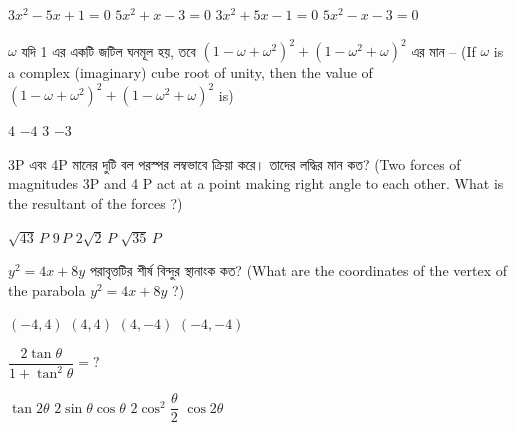 \documentclass[addpoints]{exam}
\begin{document}
\begin{questions}
\begin{oneparchoices}
\choice $ 3x^{2}-5x+1= 0 $
\choice $ 5x^{2}+x-3= 0 $
\choice $ 3x^{2}+5x-1= 0 $
\choice $ 5x^{2}-x-3= 0 $
\end{oneparchoices}

\question $ \omega $ যদি 1 এর একটি জটিল ঘনমূল হয়, তবে $ (1-\omega +\omega^{2})^{2}+(1-\omega^{2}+\omega)^{2} $ এর মান – (If $ \omega $ is a complex (imaginary) cube root of unity, then the value of $ (1-\omega +\omega^{2})^{2}+(1-\omega^{2}+\omega)^{2} $ is)
 
\begin{oneparchoices}
\choice $ 4 $
\choice $ -4 $
\choice $ 3 $
\choice $ -3 $
\end{oneparchoices}

\question 3P এবং 4P মানের দুটি বল পরস্পর লম্বভাবে ক্রিয়া করে। তাদের লদ্ধির মান কত? (Two forces of magnitudes 3P and 4 P act at a point making right angle to each other. What is the resultant of the forces ?)


\begin{oneparchoices}
 \choice $ \sqrt{43}\,P $
 \choice $ 9\,P $
 \choice $ 2\sqrt{2}\,P $
 \choice $ \sqrt{35}\,P $
\end{oneparchoices}

\question  $ y^{2} = 4x+8y $ পরাবৃত্তটির শীর্ষ বিন্দুর স্থানাংক কত? (What are the coordinates of the vertex of the parabola $ y^{2} = 4x+8y $ ?)

\begin{oneparchoices}
\choice $ (-4,4) $
\choice $ (4,4) $
\choice $ (4,-4) $
\choice $ (-4,-4) $
\end{oneparchoices}

\question $ \dfrac{2\tan\theta}{1+\tan^{2}\theta} =? $

\begin{oneparchoices}
\choice $ \tan 2\theta $
\choice $ 2\sin \theta\cos \theta $
\choice $ 2\cos^{2}\dfrac{\theta}{2} $
\choice $ \cos 2\theta $
\end{oneparchoices}

\end{questions}
\end{document}
